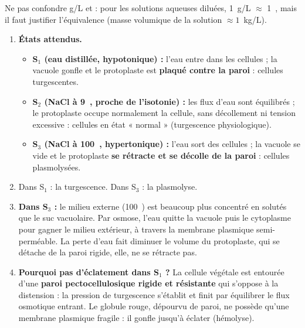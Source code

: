 \documentclass[11pt]{article}
\newcommand{\cle}[1]{{\popxbold\color{popdark}#1}}
\begin{document}
\begin{attention}
Ne pas confondre g/L et \textperthousand : pour les solutions aqueuses diluées, 1~g/L $\approx$ 1~\textperthousand, mais il faut justifier l'équivalence (masse volumique de la solution $\approx 1$~kg/L).
\end{attention}

\begin{corrige}
\begin{enumerate}
\item \textbf{États attendus.}
\begin{itemize}
\item \textbf{S$_1$ (eau distillée, hypotonique) :} l'eau entre dans les cellules ; la vacuole gonfle et le protoplaste est \textbf{plaqué contre la paroi} : cellules \cle{turgescentes}.
\item \textbf{S$_2$ (NaCl à 9~\textperthousand, proche de l'isotonie) :} les flux d'eau sont équilibrés ; le protoplaste occupe normalement la cellule, sans décollement ni tension excessive : cellules en état « normal » (turgescence physiologique).
\item \textbf{S$_3$ (NaCl à 100~\textperthousand, hypertonique) :} l'eau sort des cellules ; la vacuole se vide et le protoplaste \textbf{se rétracte et se décolle de la paroi} : cellules \cle{plasmolysées}.
\end{itemize}
\item Dans S$_1$ : la \cle{turgescence}. Dans S$_3$ : la \cle{plasmolyse}.
\item \textbf{Dans S$_3$ :} le milieu externe (100~\textperthousand) est beaucoup plus concentré en solutés que le suc vacuolaire. Par \cle{osmose}, l'eau quitte la vacuole puis le cytoplasme pour gagner le milieu extérieur, à travers la membrane plasmique semi-perméable. La perte d'eau fait diminuer le volume du protoplaste, qui se détache de la paroi rigide, elle, ne se rétracte pas.
\item \textbf{Pourquoi pas d'éclatement dans S$_1$ ?} La cellule végétale est entourée d'une \textbf{paroi pectocellulosique rigide et résistante} qui s'oppose à la distension : la pression de turgescence s'établit et finit par équilibrer le flux osmotique entrant. Le globule rouge, dépourvu de paroi, ne possède qu'une membrane plasmique fragile : il gonfle jusqu'à éclater (hémolyse).
\end{enumerate}
\end{corrige}
\end{document}
